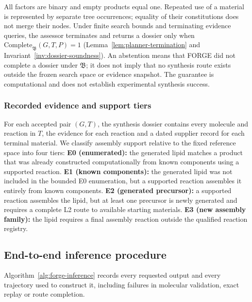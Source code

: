 All factors are binary and empty products equal one. Repeated use of a material is represented by
separate tree occurrences; equality of their constitutions does not merge their nodes.
Under finite search bounds and terminating evidence queries, the assessor terminates and returns a
dossier only when $\mathrm{Complete}_{\mathfrak B}(G,T,P)=1$
(Lemma~\ref{lem:planner-termination} and Invariant~\ref{inv:dossier-soundness}).
An abstention means that FORGE did not complete a dossier under $\mathfrak B$; it does not imply that
no synthesis route exists outside the frozen search space or evidence snapshot.
The guarantee is computational and does not establish experimental synthesis success.

\subsubsection{Recorded evidence and support tiers}

For each accepted pair $(G,T)$, the synthesis dossier contains every molecule and reaction in $T$,
the evidence for each reaction and a dated supplier record for each terminal material.
We classify assembly support relative to the fixed reference space into four tiers:
\textbf{E0 (enumerated):} the generated lipid matches a product that was already constructed
computationally from known components using a supported reaction.
\textbf{E1 (known components):} the generated lipid was not included in the bounded E0 enumeration,
but a supported reaction assembles it entirely from known components.
\textbf{E2 (generated precursor):} a supported reaction assembles the lipid, but at least one
precursor is newly generated and requires a complete L2 route to available starting materials.
\textbf{E3 (new assembly family):} the lipid requires a final assembly reaction outside the
qualified reaction registry.

\subsection{End-to-end inference procedure}
\label{app:inference}

Algorithm~\ref{alg:forge-inference} records every requested output and every trajectory used to
construct it, including failures in molecular validation, exact replay or route completion.

